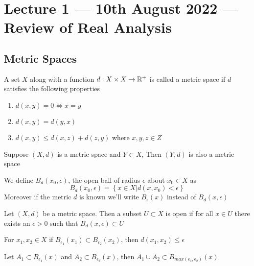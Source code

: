 \section{Lecture 1 --- 10th August 2022 --- Review of Real Analysis}


\subsection{Metric Spaces}
\begin{definition}
    \label{def:Metric_space}
    A set $X$ along with a function $d: X\times X \to \mathbb R^+$ is called a metric space if $d$ satisfies the following properties
    \begin{enumerate}
        \item $d(x,y) = 0 \iff x=y$
        \item $d(x,y) = d(y,x)$
        \item $d(x,y) \le d(x, z) + d(z, y)$ where $x, y, z \in Z$
    \end{enumerate}
\end{definition}

Suppose $(X,d)$ is a metric space and $Y \subset X$, Then $(Y,d)$ is also a metric space

\begin{definition}
    \label{def:open_ball}
    We define $B_d(x_0, \epsilon)$, the open ball of radius $\epsilon$ about $x_0 \in X$ as $$B_d \left(x_0, \epsilon \right) = \left\{ x \in X \vert d\left(x, x_0\right) < \epsilon \right\}$$
    Moreover if the metric $d$ is known we'll write $B_{\epsilon}(x)$ instead of $B_d(x, \epsilon)$ 
\end{definition}

\begin{definition}
    \label{def:open_set}
    Let $(X,d)$ be a metric space. Then a subset $U \subset X$ is open if for all $x \in U$ there exists an $\epsilon > 0$ such that $B_d(x, \epsilon) \subset U$
\end{definition}

\begin{fact}
    For $x_1, x_2 \in X$ if $B_{\epsilon_1}(x_1) \subset B_{\epsilon_2}(x_2)$, then $d(x_1, x_2) \le \epsilon$
\end{fact}

\begin{fact}
    Let $A_1 \subset B_{\epsilon_1}(x)$ and $A_2 \subset B_{\epsilon_2}(x)$, then $A_1 \cup A_2 \subset B_{max(\epsilon_1, \epsilon_2)}(x)$
\end{fact}

